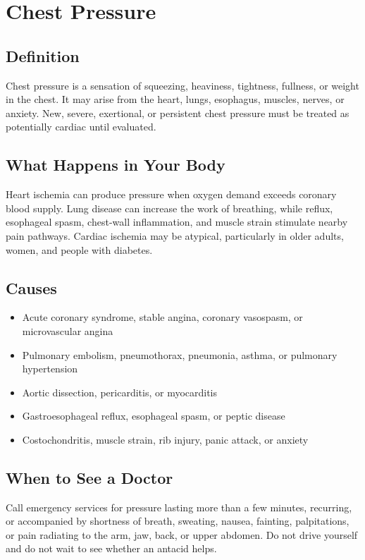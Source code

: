 \chapter{Chest Pressure}

\section*{Definition}
Chest pressure is a sensation of squeezing, heaviness, tightness, fullness, or weight in the chest. It may arise from the heart, lungs, esophagus, muscles, nerves, or anxiety. New, severe, exertional, or persistent chest pressure must be treated as potentially cardiac until evaluated.

\section*{What Happens in Your Body}
Heart ischemia can produce pressure when oxygen demand exceeds coronary blood supply. Lung disease can increase the work of breathing, while reflux, esophageal spasm, chest-wall inflammation, and muscle strain stimulate nearby pain pathways. Cardiac ischemia may be atypical, particularly in older adults, women, and people with diabetes.

\section*{Causes}
\begin{itemize}
  \item Acute coronary syndrome, stable angina, coronary vasospasm, or microvascular angina
  \item Pulmonary embolism, pneumothorax, pneumonia, asthma, or pulmonary hypertension
  \item Aortic dissection, pericarditis, or myocarditis
  \item Gastroesophageal reflux, esophageal spasm, or peptic disease
  \item Costochondritis, muscle strain, rib injury, panic attack, or anxiety
\end{itemize}

\section*{When to See a Doctor}
Call emergency services for pressure lasting more than a few minutes, recurring, or accompanied by shortness of breath, sweating, nausea, fainting, palpitations, or pain radiating to the arm, jaw, back, or upper abdomen. Do not drive yourself and do not wait to see whether an antacid helps.

